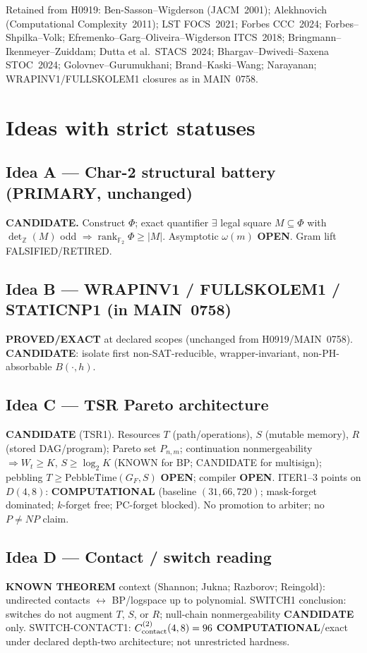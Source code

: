 \documentclass[11pt]{article}
\begin{document}
Retained from H0919: Ben-Sasson--Wigderson (JACM~2001); Alekhnovich (Computational Complexity~2011); LST FOCS~2021; Forbes CCC~2024; Forbes--Shpilka--Volk; Efremenko--Garg--Oliveira--Wigderson ITCS~2018; Bringmann--Ikenmeyer--Zuiddam; Dutta et al.\ STACS~2024; Bhargav--Dwivedi--Saxena STOC~2024; Golovnev--Gurumukhani; Brand--Kaski--Wang; Narayanan; WRAPINV1/FULLSKOLEM1 closures as in MAIN~0758.

\section*{Ideas with strict statuses}
\subsection*{Idea A --- Char-2 structural battery (PRIMARY, unchanged)}
\textbf{CANDIDATE.} Construct $\Phi$; exact quantifier
$\exists$ legal square $M\subseteq\Phi$ with $\det_{\mathbb Z}(M)$ odd
$\Rightarrow\operatorname{rank}_{\mathbb F_2}\Phi\ge|M|$. Asymptotic $\omega(m)$ \textbf{OPEN}.
Gram lift FALSIFIED/RETIRED.

\subsection*{Idea B --- WRAPINV1 / FULLSKOLEM1 / STATICNP1 (in MAIN~0758)}
\textbf{PROVED/EXACT} at declared scopes (unchanged from H0919/MAIN~0758).
\textbf{CANDIDATE}: isolate first non-SAT-reducible, wrapper-invariant, non-PH-absorbable $B(\cdot,h)$.

\subsection*{Idea C --- TSR Pareto architecture}
\textbf{CANDIDATE} (TSR1). Resources $T$ (path/operations), $S$ (mutable memory), $R$ (stored DAG/program);
Pareto set $P_{n,m}$; continuation nonmergeability $\Rightarrow W_t\ge K$, $S\ge\log_2 K$ (KNOWN for BP; CANDIDATE for multisign);
pebbling $T\ge\mathrm{PebbleTime}(G_F,S)$ \textbf{OPEN}; compiler \textbf{OPEN}.
ITER1--3 points on $D(4,8)$: \textbf{COMPUTATIONAL} (baseline $(31,66,720)$; mask-forget dominated; $k$-forget free; PC-forget blocked).
No promotion to arbiter; no $P\neq NP$ claim.

\subsection*{Idea D --- Contact / switch reading}
\textbf{KNOWN THEOREM} context (Shannon; Jukna; Razborov; Reingold): undirected contacts $\leftrightarrow$ BP/logspace up to polynomial.
SWITCH1 conclusion: switches do not augment $T$, $S$, or $R$; null-chain nonmergeability \textbf{CANDIDATE} only.
SWITCH-CONTACT1: $C^{(2)}_{\rm contact}(4,8)=96$ \textbf{COMPUTATIONAL}/exact under declared depth-two architecture; not unrestricted hardness.
\end{document}

